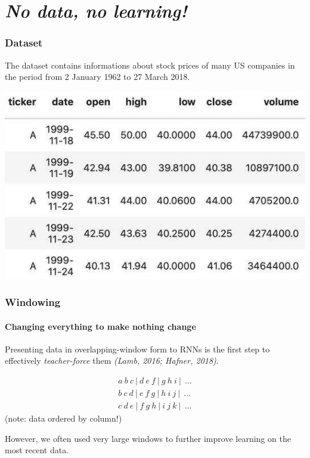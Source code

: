 \documentclass{beamer}
\begin{document}
\section{\textit{No data, no learning!}}{

\begin{frame}
	\frametitle{Dataset}
	The dataset contains informations about stock prices of many US companies in the period from 2 January 1962 to 27 March 2018.

	\begin{center}
	\includegraphics[scale = 0.40]{stock.jpg}
         \end{center}

\end{frame}
\begin{frame}
	\frametitle{Windowing}
	\framesubtitle{Changing everything to make nothing change}

	Presenting data in overlapping-window form to RNNs is the first step to effectively \textit{teacher-force} them \textit{(Lamb, 2016; Hafner, 2018)}.

\begin{gather*}
a\ b\ c\ |\ d\ e\ f\ |\ g\ h\ i\ |\ \ \dots \\
b\ c\ d\ |\ e\ f\ g\ |\ h\ i\ j\ |\ \ \dots \\
c\ d\ e\ |\ f\ g\ h\ |\ i\ j\ k\ |\ \ \dots
\end{gather*}
(note: data ordered by column!)

\hfill\break

However, we often used very large windows to further improve learning on the most recent data.



\end{frame}}
\end{document}

